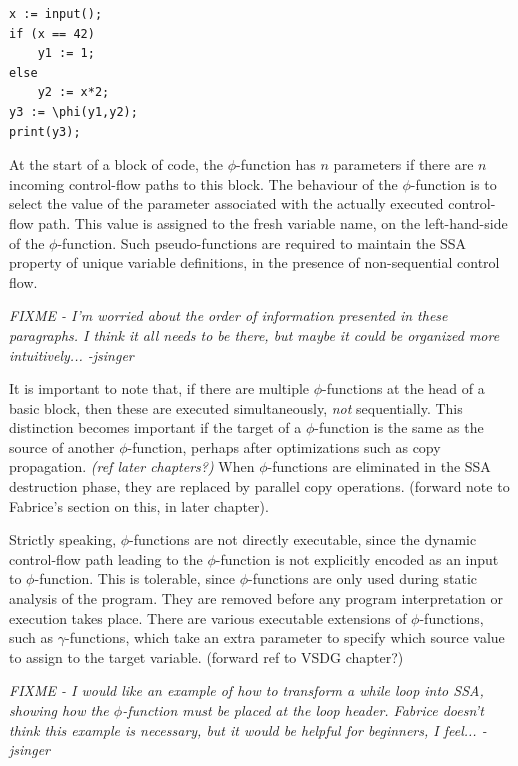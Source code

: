 \begin{verbatim}
x := input();
if (x == 42)
    y1 := 1;
else
    y2 := x*2;
y3 := \phi(y1,y2);
print(y3);
\end{verbatim}



At the start of a block of code, the $\phi$-function has
$n$ parameters if there are $n$ incoming control-flow paths to this block.
The behaviour of the $\phi$-function is to select the value
of the parameter associated with the actually executed control-flow path.
This value is assigned to the fresh variable name, on the left-hand-side
of the $\phi$-function.
Such pseudo-functions are required to maintain the SSA property
of unique variable definitions,
in the presence of non-sequential control flow.

\textit{FIXME - I'm worried about the order of information
presented in these paragraphs. I think it all needs to be there,
but maybe it could be organized more intuitively... -jsinger}

It is important to note that, if there are multiple $\phi$-functions
at the head of a basic block, then these are executed simultaneously,
\textit{not} sequentially.
This distinction becomes important if the target of a $\phi$-function
is the same as the source of another $\phi$-function, perhaps after
optimizations such as copy propagation. \textit{(ref later chapters?)}
When $\phi$-functions are eliminated in the SSA destruction phase,
they are replaced by parallel copy operations.
(forward note to Fabrice's section on this,
in later chapter).

Strictly speaking, $\phi$-functions are not directly executable,
since the dynamic control-flow path leading to the $\phi$-function
is not explicitly encoded as an input to $\phi$-function.
This is tolerable, since $\phi$-functions are only 
used during static analysis of the program. They are removed
before any program interpretation or execution takes place.
There are various executable extensions of $\phi$-functions, 
such as $\gamma$-functions, which take
an extra parameter to specify which source value to assign to the
target variable. (forward ref to VSDG chapter?)

\textit{FIXME - I would like an example of how to transform a 
while loop into SSA, showing how the $\phi$-function
must be placed at the loop header. Fabrice doesn't think this
example is necessary, but it would be helpful for beginners, I feel...
-jsinger}

